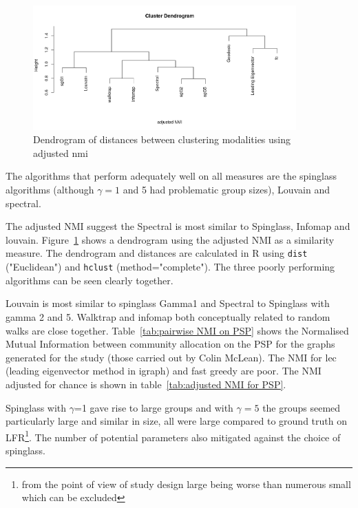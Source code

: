 \begin{figure}
    \centering
    \includegraphics[width=0.9\textwidth]{images/chapter_community_detection/ggplot2/adj_nmi_dendrogram/Rplot_adj_nmi.png}
    \caption{Dendrogram of distances between clustering modalities using adjusted nmi}
    
    \label{fig:adj_nmi_dendrogram}
    
\end{figure}





The algorithms that perform adequately well on all measures are the spinglass algorithms (although $\gamma=1$ and 5 had problematic group sizes), Louvain and spectral.

The adjusted NMI suggest the Spectral is most similar to Spinglass, Infomap and louvain. Figure~\ref{fig:adj_nmi_dendrogram} shows a dendrogram using the adjusted NMI as a similarity measure. The dendrogram and distances are calculated in R using \texttt{dist} ("Euclidean") and \texttt{hclust} (method="complete"). The three poorly performing algorithms can be seen clearly together.

Louvain is most similar to spinglass Gamma1 and Spectral to Spinglass with gamma 2 and 5. Walktrap and infomap both conceptually related to random walks are close together. Table~\ref{tab:pairwise NMI on PSP} shows the Normalised Mutual Information between community allocation on the PSP for the graphs generated for the study (those carried out by Colin McLean). The NMI for lec (leading eigenvector method in igraph) and fast greedy are poor. The NMI adjusted for chance is shown in table~\ref{tab:adjusted NMI for PSP}. 

Spinglass with $\gamma$=1 gave rise to large groups and with $\gamma=5$ the groups seemed particularly large and similar in size, all were large compared to ground truth on LFR\footnote{from the point of view of study design large being worse than numerous small which can be excluded}. The number of potential parameters also mitigated against the choice of spinglass.




